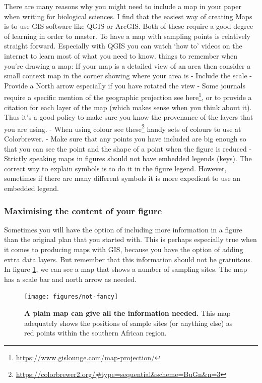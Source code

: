 \documentclass[
]{krantz}
\renewcommand{\href}[2]{#2\footnote{\url{#1}}}
\begin{document}
There are many reasons why you might need to include a map in your paper when writing for biological sciences. I find that the easiest way of creating Maps is to use GIS software like QGIS or ArcGIS. Both of these require a good degree of learning in order to master. To have a map with sampling points is relatively straight forward. Especially with QGIS you can watch `how to' videos on the internet to learn most of what you need to know. things to remember when you're drawing a map:
If your map is a detailed view of an area then consider a small context map in the corner showing where your area is
- Include the scale
- Provide a North arrow especially if you have rotated the view
- Some journals require a specific mention of the geographic projection \href{https://www.gislounge.com/map-projection/}{see here}, or to provide a citation for each layer of the map (which makes sense when you think about it). Thus it's a good policy to make sure you know the provenance of the layers that you are using.
- When using colour see \href{https://colorbrewer2.org/\#type=sequential\&scheme=BuGn\&n=3}{these} handy sets of colours to use at Colorbrewer.
- Make sure that any points you have included are big enough so that you can see the point and the shape of a point when the figure is reduced
- Strictly speaking maps in figures should not have embedded legends (keys). The correct way to explain symbols is to do it in the figure legend. However, sometimes if there are many different symbols it is more expedient to use an embedded legend.

\hypertarget{maximising-the-content-of-your-figure}{%
\subsubsection{Maximising the content of your figure}\label{maximising-the-content-of-your-figure}}

Sometimes you will have the option of including more information in a figure than the original plan that you started with. This is perhaps especially true when it comes to producing maps with GIS, because you have the option of adding extra data layers. But remember that this information should not be gratuitous. In figure \ref{fig:not-fancy}, we can see a map that shows a number of sampling sites. The map has a scale bar and north arrow as needed.



\begin{figure}

{\centering \texttt{[image: figures/not-fancy]} 

}

\caption{\textbf{A plain map can give all the information needed.} This map adequately shows the positions of sample sites (or anything else) as red points within the southern African region.}\label{fig:not-fancy}
\end{figure}
\end{document}
